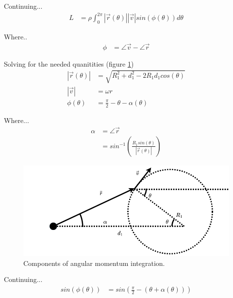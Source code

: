 \documentclass{article}
\begin{document}
	Continuing...
	\begin{align}
		L &= \rho\int_0^{2\pi}|\vec{r}(\theta)||\vec{v}|sin(\phi(\theta))d\theta
	\end{align}

	Where..
	\begin{align}
		\phi &= \angle\vec{v} - \angle\vec{r}
	\end{align}

	Solving for the needed quanitities (figure \ref{fig:one-arm-integral-angles})
	\begin{align}
		|\vec{r}(\theta)| &= \sqrt{R_1^2 + d_1^2 -2R_1d_1cos(\theta)} \\
		|\vec{v}| &= \omega r\\
		\phi(\theta) &= \frac{\pi}{2}-\theta-\alpha(\theta)
	\end{align}
	
	Where...
	\begin{align}
		\alpha &= \angle\vec{r}\\
		 &= sin^{-1}(\frac{R_1sin(\theta)}{|\vec{r}(\theta)|})
	\end{align}

	\begin{figure}[h!]
		\includegraphics[width=\linewidth]{../diagrams/fern-v3-single-arm-angles-diagram.png}   
	 	\caption{Components of angular momentum integration.}
	 	\label{fig:one-arm-integral-angles}
 	\end{figure}

	Continuing...
	\begin{align}
		sin(\phi(\theta)) &= sin(\frac{\pi}{2}-(\theta+\alpha(\theta)))
	\end{align}
\end{document}
